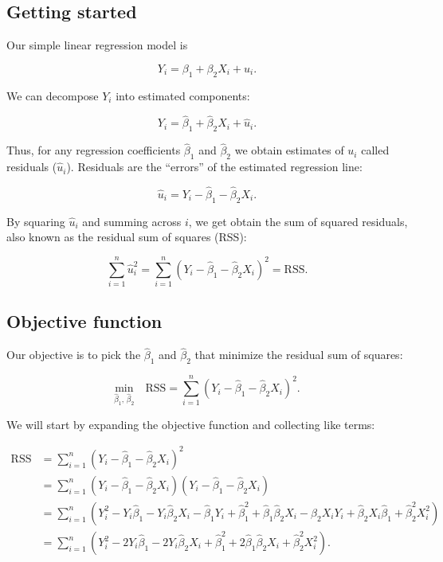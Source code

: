\documentclass[12pt]{exam}
\title{\texttt{\textbf{\assignment}} \\ \texttt{\class}}
\author{\text{\instructor} \\ \text{\institution} \\ \text{\department}}
\date{}
\begin{document}
\maketitle

\subsection*{Getting started}

\noindent Our simple linear regression model is

$$Y_i = \beta_1 + \beta_2 X_i + u_i.$$

\noindent We can decompose $Y_i$ into estimated components:

$$Y_i = \hat{\beta}_1 + \hat{\beta}_2 X_i + \hat{u}_i.$$

\noindent Thus, for any regression coefficients $\hat{\beta}_1$ and $\hat{\beta}_2$ we obtain estimates of $u_i$ called residuals ($\hat{u}_i$). Residuals are the ``errors'' of the estimated regression line:

$$\hat{u}_i = Y_i - \hat{\beta}_1 - \hat{\beta}_2 X_i.$$

\noindent By squaring $\hat{u}_i$ and summing across $i$, we get obtain the sum of squared residuals, also known as the residual sum of squares (RSS):

$$\sum_{i=1}^n \hat{u}_i^2 = \sum_{i=1}^n (Y_i - \hat{\beta}_1 - \hat{\beta}_2X_i)^2 = \text{RSS}.$$

\subsection*{Objective function}

\noindent Our objective is to pick the $\hat{\beta}_1$ and $\hat{\beta}_2$ that minimize the residual sum of squares:

$$\underset{\hat{\beta}_1,\, \hat{\beta}_2}{\text{min}} \quad \text{RSS} = \sum_{i=1}^n (Y_i - \hat{\beta}_1 - \hat{\beta}_2X_i)^2.$$

\noindent We will start by expanding the objective function and collecting like terms:

\begin{align}
\text{RSS} &= \sum_{i=1}^n (Y_i - \hat{\beta}_1 - \hat{\beta}_2X_i)^2 \\
&= \sum_{i=1}^n (Y_i - \hat{\beta}_1 - \hat{\beta}_2X_i)(Y_i - \hat{\beta}_1 - \hat{\beta}_2X_i) \\
& = \sum_{i=1}^n (Y_i^2 - Y_i\hat{\beta}_1 - Y_i\hat{\beta}_2X_i - \hat{\beta}_1Y_i + \hat{\beta}_1^2 + \hat{\beta}_1\hat{\beta}_2X_i - \hat{\beta}_2X_iY_i + \hat{\beta}_2X_i\hat{\beta}_1 + \hat{\beta}_2^2X_i^2) \\
&= \sum_{i=1}^n (Y_i^2 - 2Y_i\hat{\beta}_1 - 2Y_i\hat{\beta}_2X_i + \hat{\beta}_1^2 + 2\hat{\beta}_1\hat{\beta}_2X_i  + \hat{\beta}_2^2X_i^2).
\end{align}
\end{document}
